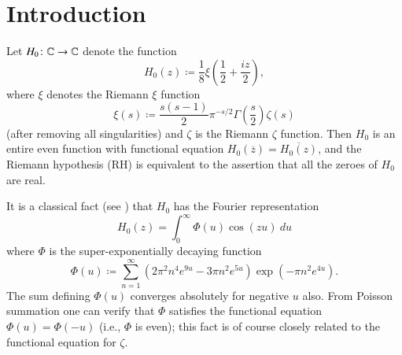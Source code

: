 \section{Introduction}

Let $H_0 \colon \mathbb{C} \to \mathbb{C}$ denote the function
\begin{equation}\label{hoz}
 H_0(z) \coloneqq \frac{1}{8} \xi\left(\frac{1}{2} + \frac{iz}{2}\right),
\end{equation}
where $\xi$ denotes the Riemann $\xi$ function
\begin{equation}\label{sas}
 \xi(s) \coloneqq \frac{s(s-1)}{2} \pi^{-s/2} \Gamma\left(\frac{s}{2}\right) \zeta(s)
\end{equation}
(after removing all singularities) and $\zeta$ is the Riemann $\zeta$ function.
Then $H_0$ is an entire even function with functional equation $H_0(\overline{z}) = \overline{H_0(z)}$, and the Riemann hypothesis (RH) is equivalent to the assertion that all the zeroes of $H_0$ are real.

It is a classical fact (see \cite[p. 255]{titch}) that $H_0$ has the Fourier representation
$$ H_0(z) = \int_0^\infty \Phi(u) \cos(zu)\ du$$
where $\Phi$ is the super-exponentially decaying function
\begin{equation}\label{phidef}
 \Phi(u) \coloneqq \sum_{n=1}^\infty (2\pi^2  n^4 e^{9u} - 3\pi n^2 e^{5u} ) \exp(-\pi n^2 e^{4u} ).
\end{equation}
The sum defining $\Phi(u)$ converges absolutely for negative $u$ also.  From Poisson summation one can verify that $\Phi$ satisfies the functional equation $\Phi(u) = \Phi(-u)$ (i.e., $\Phi$ is even); this fact is of course closely related to the functional equation for $\zeta$. 


